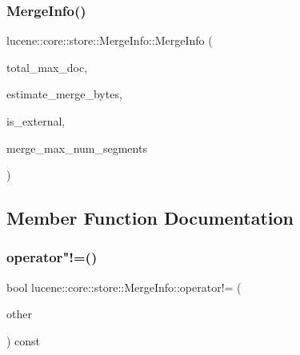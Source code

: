 \subsubsection{\texorpdfstring{Merge\+Info()}{MergeInfo()}}
{\footnotesize\ttfamily lucene\+::core\+::store\+::\+Merge\+Info\+::\+Merge\+Info (\begin{DoxyParamCaption}\item[{\mbox{\hyperlink{ZlibCrc32_8h_a2c212835823e3c54a8ab6d95c652660e}{const}} uint32\+\_\+t}]{total\+\_\+max\+\_\+doc,  }\item[{\mbox{\hyperlink{ZlibCrc32_8h_a2c212835823e3c54a8ab6d95c652660e}{const}} uint64\+\_\+t}]{estimate\+\_\+merge\+\_\+bytes,  }\item[{\mbox{\hyperlink{ZlibCrc32_8h_a2c212835823e3c54a8ab6d95c652660e}{const}} bool}]{is\+\_\+external,  }\item[{\mbox{\hyperlink{ZlibCrc32_8h_a2c212835823e3c54a8ab6d95c652660e}{const}} uint32\+\_\+t}]{merge\+\_\+max\+\_\+num\+\_\+segments }\end{DoxyParamCaption})\hspace{0.3cm}{\ttfamily [inline]}}



\subsection{Member Function Documentation}
\mbox{\label{classlucene_1_1core_1_1store_1_1MergeInfo_aa3f1f760ec304fae3dd368cd88957e84}} 
\subsubsection{\texorpdfstring{operator"!=()}{operator!=()}}
{\footnotesize\ttfamily bool lucene\+::core\+::store\+::\+Merge\+Info\+::operator!= (\begin{DoxyParamCaption}\item[{\mbox{\hyperlink{ZlibCrc32_8h_a2c212835823e3c54a8ab6d95c652660e}{const}} \mbox{\hyperlink{classlucene_1_1core_1_1store_1_1MergeInfo}{Merge\+Info}} \&}]{other }\end{DoxyParamCaption}) const\hspace{0.3cm}{\ttfamily [inline]}}


